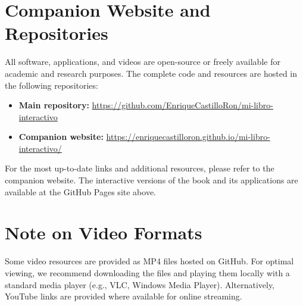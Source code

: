 \section{Companion Website and Repositories}

All software, applications, and videos are open-source or freely available for academic and research purposes. The complete code and resources are hosted in the following repositories:

\begin{itemize}
    \item \textbf{Main repository:} \url{https://github.com/EnriqueCastilloRon/mi-libro-interactivo}
    \item \textbf{Companion website:} \url{https://enriquecastilloron.github.io/mi-libro-interactivo/}
\end{itemize}

For the most up-to-date links and additional resources, please refer to the companion website. The interactive versions of the book and its applications are available at the GitHub Pages site above.

\section*{Note on Video Formats}

Some video resources are provided as MP4 files hosted on GitHub. For optimal viewing, we recommend downloading the files and playing them locally with a standard media player (e.g., VLC, Windows Media Player). Alternatively, YouTube links are provided where available for online streaming. 